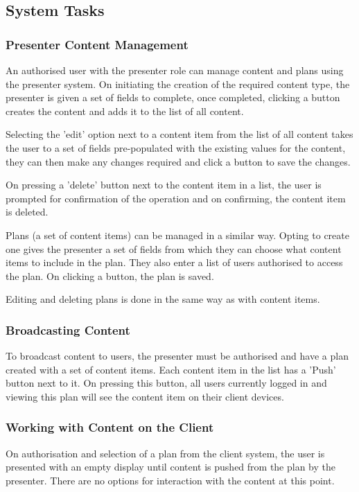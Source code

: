 \documentclass[a4papert,11pt,notitlepage]{ltxdoc}
\begin{document}
\subsection{System Tasks}
\subsubsection{Presenter Content Management}
An authorised user with the presenter role can manage content and plans using the presenter system. On initiating the creation of the required content type, the presenter is given a set of fields to complete, once completed, clicking a button creates the content and adds it to the list of all content.

Selecting the 'edit' option next to a content item from the list of all content takes the user to a set of fields pre-populated with the existing values for the content, they can then make any changes required and click a button to save the changes.

On pressing a 'delete' button next to the content item in a list, the user is prompted for confirmation of the operation and on confirming, the content item is deleted.

Plans (a set of content items) can be managed in a similar way. Opting to create one gives the presenter a set of fields from which they can choose what content items to include in the plan. They also enter a list of users authorised to access the plan. On clicking a button, the plan is saved.

Editing and deleting plans is done in the same way as with content items.

\subsubsection{Broadcasting Content}
To broadcast content to users, the presenter must be authorised and have a plan created with a set of content items. Each content item in the list has a 'Push' button next to it. On pressing this button, all users currently logged in and viewing this plan will see the content item on their client devices.

\subsubsection{Working with Content on the Client}
On authorisation and selection of a plan from the client system, the user is presented with an empty display until content is pushed from the plan by the presenter. There are no options for interaction with the content at this point.
\end{document}
